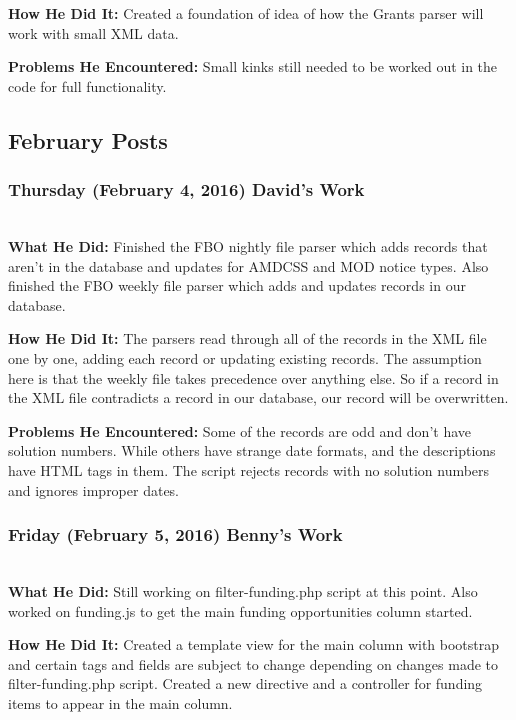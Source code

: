 \documentclass[onecolumn]{IEEEtran}
\begin{document}
	\textbf{How He Did It: }
	Created a foundation of idea of how the Grants parser will work with small XML data. 
    
	\textbf{Problems He Encountered: }
	Small kinks still needed to be worked out in the code for full functionality. 

\subsection{February Posts}
\subsubsection{Thursday (February 4, 2016) David's Work  } \hspace*{\fill} \\
    \textbf{What He Did: } 
    Finished the FBO nightly file parser which adds records that aren't in the database and updates for AMDCSS and MOD notice types. Also finished the FBO weekly file parser which adds and updates records in our database. 
    
	\textbf{How He Did It: }
	The parsers read through all of the records in the XML file one by one, adding each record or updating existing records. The assumption here is that the weekly file takes precedence over anything else. So if a record in the XML file contradicts a record in our database, our record will be overwritten. 
    
	\textbf{Problems He Encountered: }
	Some of the records are odd and don't have solution numbers. While others have strange date formats, and the descriptions have HTML tags in them. The script rejects records with no solution numbers and ignores improper dates. 

\subsubsection{Friday (February 5, 2016) Benny's Work  } \hspace*{\fill} \\
    \textbf{What He Did: } 
    Still working on filter-funding.php script at this point. Also worked on funding.js to get the main funding opportunities column started.  
    
	\textbf{How He Did It: }
	Created a template view for the main column with bootstrap and certain tags and fields are subject to change depending on changes made to filter-funding.php script. Created a new directive and a controller for funding items to appear in the main column.  
    
\end{document}
